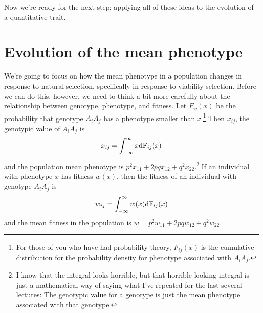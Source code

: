 \documentclass[12pt]{article}
\begin{document}
Now we're ready for the next step: applying all of these ideas to the
evolution of a quantitative trait.

\section*{Evolution of the mean phenotype}

We're going to focus on how the mean phenotype in a population changes
in response to natural selection, specifically in response to
viability selection.  Before we can do this, however, we need to think
a bit more carefully about the relationship between genotype,
phenotype, and fitness.  Let $F_{ij}(x)$ be the probability that
genotype $A_iA_j$ has a phenotype smaller than $x$.\footnote{For those
  of you who have had probability theory, $F_{ij}(x)$ is the
  cumulative distribution for the probability density for phenotype
  associated with $A_iA_j$.} Then $x_{ij}$, the genotypic value of
$A_iA_j$ is
\[
x_{ij} = \int_{-\infty}^\infty x \mbox{\rm dF}_{ij}(x)
\]
and the population mean phenotype is
$p^2x_{11} + 2pqx_{12} + q^2x_{22}$.\footnote{I know that the integral
  looks horrible, but that horrible looking integral is just a
  mathematical way of saying what I've repeated for the last several
  lectures: The genotypic value for a genotype is just the mean
  phenotype associated with that genotype.}  If an individual with
phenotype $x$ has fitness $w(x)$, then the fitness of an individual
with genotype $A_iA_j$ is
\[
w_{ij} = \int_{-\infty}^\infty w(x) \mbox{\rm dF}_{ij}(x)
\]
and the mean fitness in the population is $\bar w = p^2w_{11} +
2pqw_{12} + q^2w_{22}$.
\end{document}
